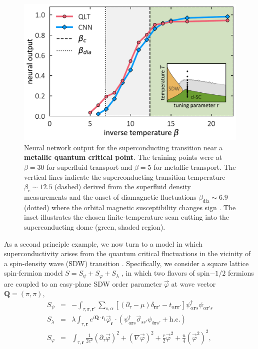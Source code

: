 \documentclass[amsmath,amssymb, aps, prx, longbibliography, twocolumn]{revtex4-1}
\begin{document}
\begin{figure}[b]
\includegraphics[scale=.43]{fig3.pdf}
\caption{Neural network output for the superconducting transition near a {\bf metallic quantum critical point}. The training points were at $\beta=30$ for superfluid transport and $\beta=5$ for metallic transport.
The vertical lines indicate the superconducting transition temperature $\beta_c\sim 12.5$ (dashed) derived from the superfluid density measurements and the onset of diamagnetic fluctuations $\beta_{\textrm{dia}} \sim 6.9$ (dotted) where the orbital magnetic susceptibility changes sign \cite{Schattner2016}. The inset illustrates the chosen finite-temperature scan cutting into the superconducting dome (green, shaded region).} %
\label{fig:afmetal}
\end{figure}
As a second principle example, we now turn to a model in which superconductivity arises from the quantum critical fluctuations in the vicinity of a spin-density wave (SDW) transition \cite{Berg2012,Schattner2016,Gerlach2017,Berg2018}. Specifically, 
we consider a square lattice spin-fermion model $S = S_\psi + S_\varphi + S_\lambda$ \cite{Schattner2016}, in which two flavors of spin$-1/2$ fermions are coupled to an easy-plane SDW order parameter $\vec{\varphi}$ at wave vector $\mathbf{Q}=(\pi, \pi)$, 
\begin{eqnarray}
S_\psi &=&  - \int_{\tau, \mathbf{r}, \mathbf{r'}} \sum_{s, \alpha} \left[ \left(\partial_\tau - \mu\right)\delta_{\mathbf{r}\mathbf{r'}} - t_{\alpha \mathbf{r}\mathbf{r'}} \right] \psi_{\alpha \mathbf{r}s}^\dagger \psi_{\alpha \mathbf{r'}s} \nonumber\\
S_\lambda &=& \lambda \int_{\tau, \mathbf{r}} e^{i \mathbf{Q}\cdot \mathbf{r_i}} \vec{\varphi}_\mathbf{r} \cdot \left( \psi_{a\mathbf{r}s}^\dagger \vec{\sigma}_{ss'}  \psi_{b\mathbf{r}s'} + \textrm{h.c.} \right) \nonumber\\
S_\varphi &=& \int_{\tau,\mathbf{r}} \frac{1}{2c^2} \left(\partial_\tau \vec{\varphi}\right)^2 + \left(\nabla \vec{\varphi} \right)^2 + \frac{r}{2}\vec \varphi^2 + \frac{u}{4} (\vec \varphi^2)^2,
\label{eq:afmetal}
\end{eqnarray}
\end{document}
